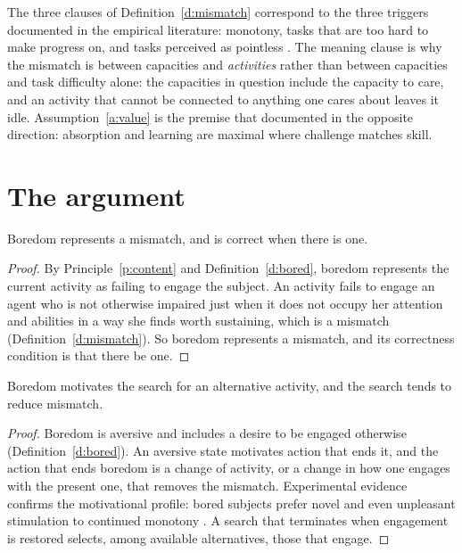 \documentclass{situationist-preprint}
\begin{document}
The three clauses of Definition~\ref{d:mismatch} correspond to the three triggers documented in the empirical literature: monotony, tasks that are too hard to make progress on, and tasks perceived as pointless \citep{WestgateWilson2018}. The meaning clause is why the mismatch is between capacities and \emph{activities} rather than between capacities and task difficulty alone: the capacities in question include the capacity to care, and an activity that cannot be connected to anything one cares about leaves it idle. Assumption~\ref{a:value} is the premise that \citet{Csikszentmihalyi1990} documented in the opposite direction: absorption and learning are maximal where challenge matches skill.

\section{The argument}

\begin{lemma}\label{l:signal}
Boredom represents a mismatch, and is correct when there is one.
\end{lemma}

\begin{proof}
By Principle~\ref{p:content} and Definition~\ref{d:bored}, boredom represents the current activity as failing to engage the subject. An activity fails to engage an agent who is not otherwise impaired just when it does not occupy her attention and abilities in a way she finds worth sustaining, which is a mismatch (Definition~\ref{d:mismatch}). So boredom represents a mismatch, and its correctness condition is that there be one.
\end{proof}

\begin{lemma}\label{l:motiv}
Boredom motivates the search for an alternative activity, and the search tends to reduce mismatch.
\end{lemma}

\begin{proof}
Boredom is aversive and includes a desire to be engaged otherwise (Definition~\ref{d:bored}). An aversive state motivates action that ends it, and the action that ends boredom is a change of activity, or a change in how one engages with the present one, that removes the mismatch. Experimental evidence confirms the motivational profile: bored subjects prefer novel and even unpleasant stimulation to continued monotony \citep{WilsonEtAl2014}. A search that terminates when engagement is restored selects, among available alternatives, those that engage.
\end{proof}
\end{document}
